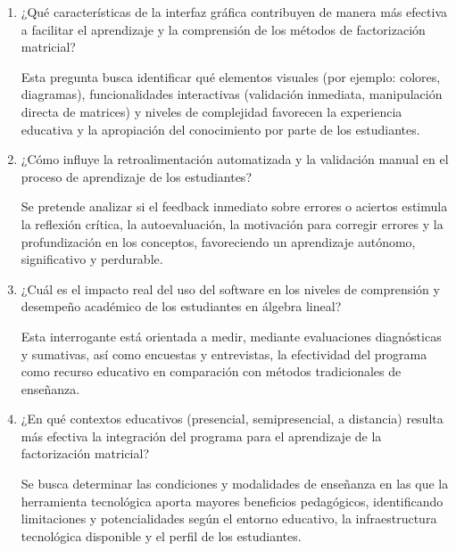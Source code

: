 \begin{enumerate}
	\item ¿Qué características de la interfaz gráfica contribuyen de manera más efectiva a facilitar el aprendizaje y la comprensión de los métodos de factorización matricial?
	
	Esta pregunta busca identificar qué elementos visuales (por ejemplo: colores, diagramas), funcionalidades interactivas (validación inmediata, manipulación directa de matrices) y niveles de complejidad favorecen la experiencia educativa y la apropiación del conocimiento por parte de los estudiantes.
	
	\item ¿Cómo influye la retroalimentación automatizada y la validación manual en el proceso de aprendizaje de los estudiantes?
	
	Se pretende analizar si el feedback inmediato sobre errores o aciertos estimula la reflexión crítica, la autoevaluación, la motivación para corregir errores y la profundización en los conceptos, favoreciendo un aprendizaje autónomo, significativo y perdurable.
	
	\item ¿Cuál es el impacto real del uso del software en los niveles de comprensión y desempeño académico de los estudiantes en álgebra lineal?
	
	Esta interrogante está orientada a medir, mediante evaluaciones diagnósticas y sumativas, así como encuestas y entrevistas, la efectividad del programa como recurso educativo en comparación con métodos tradicionales de enseñanza.
	
	\item ¿En qué contextos educativos (presencial, semipresencial, a distancia) resulta más efectiva la integración del programa para el aprendizaje de la factorización matricial?
	
	Se busca determinar las condiciones y modalidades de enseñanza en las que la herramienta tecnológica aporta mayores beneficios pedagógicos, identificando limitaciones y potencialidades según el entorno educativo, la infraestructura tecnológica disponible y el perfil de los estudiantes.
\end{enumerate}

\goodbreak

